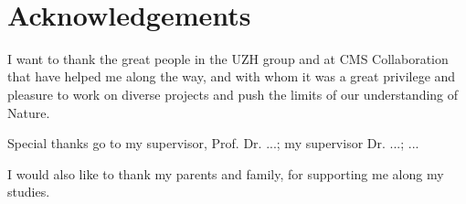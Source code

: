 \ %
\newpage
{} %
\chapter*{Acknowledgements}

I want to thank the great people in the UZH group and at CMS Collaboration that have helped me along the way, and with whom it was a great privilege and pleasure to work on diverse projects and push the limits of our understanding of Nature.

Special thanks go to my supervisor, Prof. Dr. ...; my supervisor Dr. ...; ...

I would also like to thank my parents and family, for supporting me along my studies.

\newpage